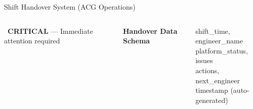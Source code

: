 \documentclass[aspectratio=169,12pt]{beamer}
\begin{document}
\begin{frame}{Shift Handover System (ACG Operations)}
\begin{columns}[t]
\vspace{4pt}
\begin{tcolorbox}[colback=AccentRed!10,colframe=AccentRed,arc=4pt,
  left=4pt,right=4pt,top=3pt,bottom=3pt]
\textcolor{AccentRed}{\faCircle}\ \textbf{CRITICAL} --- Immediate attention required
\end{tcolorbox}

\vspace{10pt}
\small\bfseries Handover Data Schema
\vspace{4pt}
\begin{tcolorbox}[colback=CodeBg,colframe=CardBorder,arc=4pt,
  left=4pt,right=4pt,top=3pt,bottom=3pt]
\ttfamily\scriptsize
\textcolor{AccentBlue}{shift\_time, engineer\_name}\\
\textcolor{BPGreen}{platform\_status, issues}\\
\textcolor{AccentGold}{actions, next\_engineer}\\
\textcolor{TextMid}{timestamp (auto-generated)}
\end{tcolorbox}
\end{columns}
\end{frame}
\end{document}
